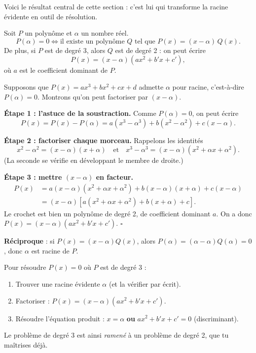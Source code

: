 \documentclass[11pt]{article}
\newcounter{popsec}
\newcounter{popsub}
\newcommand{\courssub}[1]{%
  \stepcounter{popsub}%
  \par\vspace{9pt}\noindent{\popxbold\fontsize{11.5}{13}\selectfont\color{popink}{\color{poporange}\thepopsec.\thepopsub}\hspace{6pt}#1}\par\nopagebreak\vspace{4pt}
}
\begin{document}
\courssub{Le théorème de factorisation}

Voici le résultat central de cette section : c'est lui qui transforme la racine évidente en outil de résolution.

\begin{propriete}
Soit $P$ un polynôme et $\alpha$ un nombre réel.
\[ P(\alpha) = 0 \iff \text{il existe un polynôme } Q \text{ tel que } P(x) = (x - \alpha)\,Q(x). \]
De plus, si $P$ est de degré 3, alors $Q$ est de degré 2 : on peut écrire
\[ P(x) = (x - \alpha)(ax^2 + b'x + c'), \]
où $a$ est le coefficient dominant de $P$.
\end{propriete}

\begin{experience}
Supposons que $P(x) = ax^3 + bx^2 + cx + d$ admette $\alpha$ pour racine, c'est-à-dire $P(\alpha) = 0$. Montrons qu'on peut factoriser par $(x - \alpha)$.

\textbf{Étape 1 : l'astuce de la soustraction.} Comme $P(\alpha) = 0$, on peut écrire
\[ P(x) = P(x) - P(\alpha) = a(x^3 - \alpha^3) + b(x^2 - \alpha^2) + c(x - \alpha). \]

\textbf{Étape 2 : factoriser chaque morceau.} Rappelons les identités
\[ x^2 - \alpha^2 = (x - \alpha)(x + \alpha) \quad \text{et} \quad x^3 - \alpha^3 = (x - \alpha)(x^2 + \alpha x + \alpha^2). \]
(La seconde se vérifie en développant le membre de droite.)

\textbf{Étape 3 : mettre $(x - \alpha)$ en facteur.}
\begin{align*}
P(x) &= a(x - \alpha)(x^2 + \alpha x + \alpha^2) + b(x - \alpha)(x + \alpha) + c(x - \alpha) \\
&= (x - \alpha)\left[ a(x^2 + \alpha x + \alpha^2) + b(x + \alpha) + c \right].
\end{align*}
Le crochet est bien un polynôme de degré 2, de coefficient dominant $a$. On a donc $P(x) = (x - \alpha)(ax^2 + b'x + c')$. \hfill $\square$

\textbf{Réciproque} : si $P(x) = (x - \alpha)Q(x)$, alors $P(\alpha) = (\alpha - \alpha)Q(\alpha) = 0$, donc $\alpha$ est racine de $P$.
\end{experience}

\begin{aretenir}
Pour résoudre $P(x) = 0$ où $P$ est de degré 3 :
\begin{enumerate}
\item Trouver une racine évidente $\alpha$ (et la vérifier par écrit).
\item Factoriser : $P(x) = (x - \alpha)(ax^2 + b'x + c')$.
\item Résoudre l'équation produit : $x = \alpha$ \textbf{ou} $ax^2 + b'x + c' = 0$ (discriminant).
\end{enumerate}
Le problème de degré 3 est ainsi \emph{ramené} à un problème de degré 2, que tu maîtrises déjà.
\end{aretenir}
\end{document}
